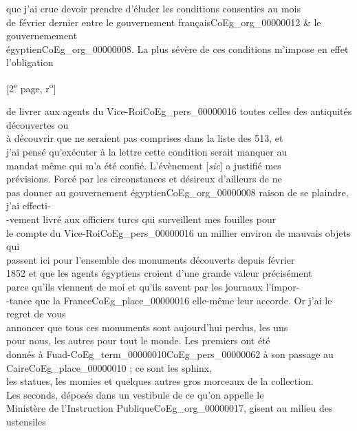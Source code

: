 \documentclass{book}
\begin{document}
que j’ai crue devoir prendre d’éluder les conditions consenties au mois\\
de février dernier entre le gouvernement français\gls{CoEg_org_00000012} \& le gouvernemement\\
égyptien\gls{CoEg_org_00000008}. La plus sévère de ces conditions m’impose en effet l’obligation
{\footnotesize\begin{center} {[2\textsuperscript{e} page, r\textsuperscript{o}]}\end{center}}
\noindent de livrer aux agents du Vice-Roi\gls{CoEg_pers_00000016} toutes celles des antiquités découvertes ou\\
à découvrir que ne seraient pas comprises dans la liste des 513, et\\
j’ai pensé qu’exécuter à la lettre cette condition serait manquer au\\
mandat même qui m’a été confié. L’évènement {[\textit{sic}]} a justifié mes\\
prévisions. Forcé par les circonstances et désireux d’ailleurs de ne\\
pas donner au gouvernement égyptien\gls{CoEg_org_00000008} raison de se plaindre, j’ai effecti-\\
-vement livré aux officiers turcs qui surveillent mes fouilles pour\\
le compte du Vice-Roi\gls{CoEg_pers_00000016} un millier environ de mauvais objets qui\\
passent ici pour l’ensemble des monuments découverts depuis février\\
1852 et que les agents égyptiens croient d’une grande valeur précisément\\
parce qu’ils viennent de moi et qu’ils savent par les journaux l’impor-\\
-tance que la France\gls{CoEg_place_00000016} elle-même leur accorde. Or j’ai le regret de vous\\
annoncer que tous ces monuments sont aujourd’hui perdus, les uns\\
pour nous, les autres pour tout le monde. Les premiers ont été\\
donnés à Fuad-\gls{CoEg_term_00000010}\gls{CoEg_pers_00000062} à son passage au Caire\gls{CoEg_place_00000010} ; ce sont les sphinx,\\
les statues, les momies et quelques autres gros morceaux de la collection.\\
Les seconds, déposés dans un vestibule de ce qu’on appelle le\\
Ministère de l’Instruction Publique\gls{CoEg_org_00000017}, gisent au milieu des ustensiles\\
\end{document}
